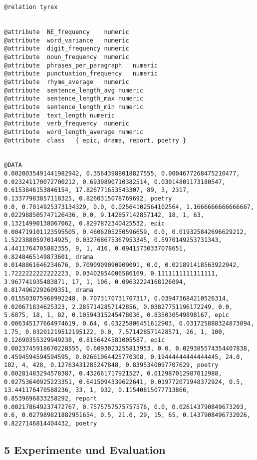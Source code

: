 \documentclass[]{article}
\begin{document}
\begin{verbatim}
@relation tyrex


@attribute  NE_frequency    numeric
@attribute  word_variance   numeric
@attribute  digit_frequency numeric
@attribute  noun_frequency  numeric
@attribute  phrases_per_paragraph   numeric
@attribute  punctuation_frequency   numeric
@attribute  rhyme_average   numeric
@attribute  sentence_length_avg numeric
@attribute  sentence_length_max numeric
@attribute  sentence_length_min numeric
@attribute  text_length numeric
@attribute  verb_frequency  numeric
@attribute  word_length_average numeric
@attribute  class   { epic, drama, report, poetry }


@DATA
0.0020035491441982942, 0.35643988018827555, 0.0004677268475210477, 0.023241170072700212, 0.6939890710382514, 0.03014801173180547, 0.6153846153846154, 17.826771653543307, 89, 3, 2317, 0.13377983857118325, 0.8260315078769692, poetry
0.0, 0.7014925373134329, 0.0, 0.02564102564102564, 1.1666666666666667, 0.022988505747126436, 0.0, 9.142857142857142, 18, 1, 63, 0.13214990138067062, 0.8297872340425532, epic
0.004719101123595505, 0.4606205250596659, 0.0, 0.019325842696629212, 1.5223880597014925, 0.032768675367953345, 0.5970149253731343, 4.4411764705882355, 9, 1, 416, 0.09415730337078651, 0.8248465149873601, drama
0.0148861646234676, 0.7090909090909091, 0.0, 0.021891418563922942, 1.7222222222222223, 0.03402854006586169, 0.1111111111111111, 3.967741935483871, 17, 1, 106, 0.09632224168126094, 0.8174962292609351, drama
0.015503875968992248, 0.7073170731707317, 0.039473684210526314, 0.020671834625323, 2.2857142857142856, 0.03827751196172249, 0.0, 5.6875, 18, 1, 82, 0.10594315245478036, 0.835030549898167, epic
0.006345177664974619, 0.64, 0.03225806451612903, 0.031725888324873094, 1.75, 0.03201219512195122, 0.0, 7.571428571428571, 26, 1, 100, 0.12690355329949238, 0.8156424581005587, epic
0.0023745918670228555, 0.6093023255813953, 0.0, 0.029385574354407838, 0.4594594594594595, 0.02661064425770308, 0.19444444444444445, 24.0, 102, 4, 428, 0.12763431285247848, 0.8395340097707629, poetry
0.00281483294578387, 0.432661717921527, 0.012987012987012988, 0.02753640925223351, 0.6415094339622641, 0.019772071948372924, 0.5, 13.441176470588236, 33, 1, 932, 0.11540815077713866, 0.8539696833258292, report
0.002178649237472767, 0.7575757575757576, 0.0, 0.026143790849673203, 0.6, 0.027989821882951654, 0.5, 21.0, 29, 15, 65, 0.1437908496732026, 0.8227146814404432, poetry
\end{verbatim}

\subsection{5 Experimente und
Evaluation}\label{experimente-und-evaluation}
\end{document}
